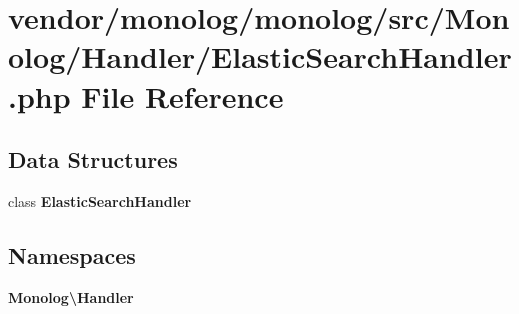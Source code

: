 \section{vendor/monolog/monolog/src/\+Monolog/\+Handler/\+Elastic\+Search\+Handler.php File Reference}
\label{_elastic_search_handler_8php}
\subsection*{Data Structures}
\begin{DoxyCompactItemize}
\item 
class {\bf Elastic\+Search\+Handler}
\end{DoxyCompactItemize}
\subsection*{Namespaces}
\begin{DoxyCompactItemize}
\item 
 {\bf Monolog\textbackslash{}\+Handler}
\end{DoxyCompactItemize}

